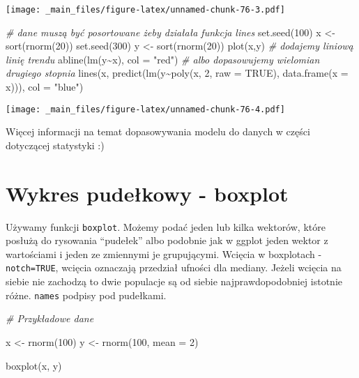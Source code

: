 \documentclass[
]{book}
\newenvironment{Shaded}{\begin{snugshade}}{\end{snugshade}}
\newcommand{\AttributeTok}[1]{\textcolor[rgb]{0.77,0.63,0.00}{#1}}
\newcommand{\CommentTok}[1]{\textcolor[rgb]{0.56,0.35,0.01}{\textit{#1}}}
\newcommand{\ConstantTok}[1]{\textcolor[rgb]{0.00,0.00,0.00}{#1}}
\newcommand{\DecValTok}[1]{\textcolor[rgb]{0.00,0.00,0.81}{#1}}
\newcommand{\FunctionTok}[1]{\textcolor[rgb]{0.00,0.00,0.00}{#1}}
\newcommand{\NormalTok}[1]{#1}
\newcommand{\OtherTok}[1]{\textcolor[rgb]{0.56,0.35,0.01}{#1}}
\newcommand{\SpecialCharTok}[1]{\textcolor[rgb]{0.00,0.00,0.00}{#1}}
\newcommand{\StringTok}[1]{\textcolor[rgb]{0.31,0.60,0.02}{#1}}
\begin{document}
\texttt{[image: \_main\_files/figure-latex/unnamed-chunk-76-3.pdf]}

\begin{Shaded}
\begin{Highlighting}[]
\CommentTok{\# dane muszą być posortowane żeby działała funkcja lines}
\FunctionTok{set.seed}\NormalTok{(}\DecValTok{100}\NormalTok{)}
\NormalTok{x }\OtherTok{\textless{}{-}} \FunctionTok{sort}\NormalTok{(}\FunctionTok{rnorm}\NormalTok{(}\DecValTok{20}\NormalTok{))}
\FunctionTok{set.seed}\NormalTok{(}\DecValTok{300}\NormalTok{)}
\NormalTok{y }\OtherTok{\textless{}{-}} \FunctionTok{sort}\NormalTok{(}\FunctionTok{rnorm}\NormalTok{(}\DecValTok{20}\NormalTok{))}
\FunctionTok{plot}\NormalTok{(x,y)}
\CommentTok{\# dodajemy liniową linię trendu}
\FunctionTok{abline}\NormalTok{(}\FunctionTok{lm}\NormalTok{(y}\SpecialCharTok{\textasciitilde{}}\NormalTok{x), }\AttributeTok{col =} \StringTok{"red"}\NormalTok{)}
\CommentTok{\# albo dopasowujemy wielomian drugiego stopnia}
\FunctionTok{lines}\NormalTok{(x, }\FunctionTok{predict}\NormalTok{(}\FunctionTok{lm}\NormalTok{(y}\SpecialCharTok{\textasciitilde{}}\FunctionTok{poly}\NormalTok{(x, }\DecValTok{2}\NormalTok{, }\AttributeTok{raw =} \ConstantTok{TRUE}\NormalTok{), }\FunctionTok{data.frame}\NormalTok{(}\AttributeTok{x =}\NormalTok{ x))), }\AttributeTok{col =} \StringTok{"blue"}\NormalTok{)}
\end{Highlighting}
\end{Shaded}

\texttt{[image: \_main\_files/figure-latex/unnamed-chunk-76-4.pdf]}

Więcej informacji na temat dopasowywania modelu do danych w części dotyczącej statystyki :)

\hypertarget{wykres-pudeux142kowy---boxplot-1}{%
\section{Wykres pudełkowy - boxplot}\label{wykres-pudeux142kowy---boxplot-1}}

Używamy funkcji \texttt{boxplot}. Możemy podać jeden lub kilka wektorów, które posłużą do rysowania ``pudełek'' albo podobnie jak w ggplot jeden wektor z wartościami i jeden ze zmiennymi je grupującymi. Wcięcia w boxplotach - \texttt{notch=TRUE}, wcięcia oznaczają przedział ufności dla mediany. Jeżeli wcięcia na siebie nie zachodzą to dwie populacje są od siebie najprawdopodobniej istotnie różne. \texttt{names} podpisy pod pudełkami.

\begin{Shaded}
\begin{Highlighting}[]
\CommentTok{\# Przykładowe dane}

\NormalTok{x }\OtherTok{\textless{}{-}} \FunctionTok{rnorm}\NormalTok{(}\DecValTok{100}\NormalTok{)}
\NormalTok{y }\OtherTok{\textless{}{-}} \FunctionTok{rnorm}\NormalTok{(}\DecValTok{100}\NormalTok{, }\AttributeTok{mean =} \DecValTok{2}\NormalTok{)}

\FunctionTok{boxplot}\NormalTok{(x, y)}
\end{Highlighting}
\end{Shaded}
\end{document}
